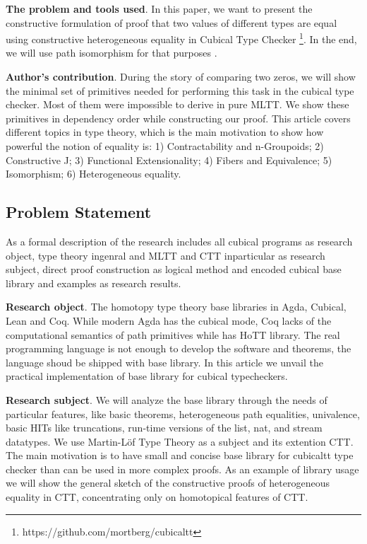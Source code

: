 \documentclass{article}
\begin{document}
{\bf The problem and tools used}. In this paper, we want to present the constructive formulation of proof
that two values of different types are equal using constructive heterogeneous equality
in Cubical Type Checker \cite{Mortberg17} \footnote{https://github.com/mortberg/cubicaltt}.
In the end, we will use path isomorphism for that purposes \cite{HoTT}.

{\bf Author's contribution}. During the story of comparing two zeros,
we will show the minimal set of primitives needed
for performing this task in the cubical type checker. Most of
them were impossible to derive in pure MLTT. We show these primitives in dependency order
while constructing our proof. This article covers different topics in type theory,
which is the main motivation to show how powerful the notion of equality is:
1) Contractability and n-Groupoids;
2) Constructive J;
3) Functional Extensionality;
4) Fibers and Equivalence;
5) Isomorphism;
6) Heterogeneous equality.

\subsection{Problem Statement}

As a formal description of the research includes all cubical programs as research object,
type theory ingenral and MLTT and CTT inparticular as research subject,
direct proof construction as logical method and encoded cubical
base library and examples as research results.

{\bf Research object}. The homotopy type theory base libraries in Agda, Cubical, Lean and Coq.
While modern Agda has the cubical mode, Coq lacks of the computational semantics of path primitives
while has HoTT library. The real programming language is not enough to
develop the software and theorems, the language shoud be shipped with base library. In this article
we unvail the practical implementation of base library for cubical typecheckers.

{\bf Research subject}. We will analyze the base library through the needs of particular features,
like basic theorems, heterogeneous path equalities, univalence, basic HITs like truncations, run-time
versions of the list, nat, and stream datatypes. We use Martin-Löf Type Theory as a subject and
its extention CTT. The main motivation is to have small and concise base library for cubicaltt
type checker than can be used in more complex proofs. As an example of library usage we will show
the general sketch of the constructive proofs of heterogeneous equality in CTT, concentrating only
on homotopical features of CTT.
\end{document}

